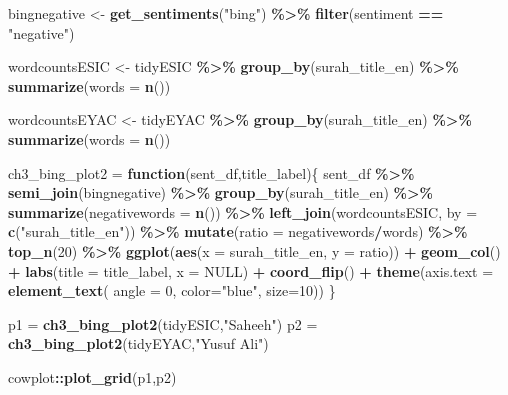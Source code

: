 \documentclass[
]{article}
\newenvironment{Shaded}{\begin{snugshade}}{\end{snugshade}}
\newcommand{\AttributeTok}[1]{\textcolor[rgb]{0.13,0.29,0.53}{#1}}
\newcommand{\ConstantTok}[1]{\textcolor[rgb]{0.56,0.35,0.01}{#1}}
\newcommand{\ControlFlowTok}[1]{\textcolor[rgb]{0.13,0.29,0.53}{\textbf{#1}}}
\newcommand{\DecValTok}[1]{\textcolor[rgb]{0.00,0.00,0.81}{#1}}
\newcommand{\FunctionTok}[1]{\textcolor[rgb]{0.13,0.29,0.53}{\textbf{#1}}}
\newcommand{\NormalTok}[1]{#1}
\newcommand{\OtherTok}[1]{\textcolor[rgb]{0.56,0.35,0.01}{#1}}
\newcommand{\SpecialCharTok}[1]{\textcolor[rgb]{0.81,0.36,0.00}{\textbf{#1}}}
\newcommand{\StringTok}[1]{\textcolor[rgb]{0.31,0.60,0.02}{#1}}
\begin{document}
\begin{Shaded}
\begin{Highlighting}[]
\NormalTok{bingnegative }\OtherTok{\textless{}{-}} \FunctionTok{get\_sentiments}\NormalTok{(}\StringTok{"bing"}\NormalTok{) }\SpecialCharTok{\%\textgreater{}\%} 
  \FunctionTok{filter}\NormalTok{(sentiment }\SpecialCharTok{==} \StringTok{"negative"}\NormalTok{)}

\NormalTok{wordcountsESIC }\OtherTok{\textless{}{-}}\NormalTok{ tidyESIC }\SpecialCharTok{\%\textgreater{}\%}
  \FunctionTok{group\_by}\NormalTok{(surah\_title\_en) }\SpecialCharTok{\%\textgreater{}\%}
  \FunctionTok{summarize}\NormalTok{(}\AttributeTok{words =} \FunctionTok{n}\NormalTok{())}

\NormalTok{wordcountsEYAC }\OtherTok{\textless{}{-}}\NormalTok{ tidyEYAC }\SpecialCharTok{\%\textgreater{}\%}
  \FunctionTok{group\_by}\NormalTok{(surah\_title\_en) }\SpecialCharTok{\%\textgreater{}\%}
  \FunctionTok{summarize}\NormalTok{(}\AttributeTok{words =} \FunctionTok{n}\NormalTok{())}

\NormalTok{ch3\_bing\_plot2 }\OtherTok{=} \ControlFlowTok{function}\NormalTok{(sent\_df,title\_label)\{}
\NormalTok{  sent\_df }\SpecialCharTok{\%\textgreater{}\%}
      \FunctionTok{semi\_join}\NormalTok{(bingnegative) }\SpecialCharTok{\%\textgreater{}\%}
      \FunctionTok{group\_by}\NormalTok{(surah\_title\_en) }\SpecialCharTok{\%\textgreater{}\%}
      \FunctionTok{summarize}\NormalTok{(}\AttributeTok{negativewords =} \FunctionTok{n}\NormalTok{()) }\SpecialCharTok{\%\textgreater{}\%}
      \FunctionTok{left\_join}\NormalTok{(wordcountsESIC, }\AttributeTok{by =} \FunctionTok{c}\NormalTok{(}\StringTok{"surah\_title\_en"}\NormalTok{)) }\SpecialCharTok{\%\textgreater{}\%}
      \FunctionTok{mutate}\NormalTok{(}\AttributeTok{ratio =}\NormalTok{ negativewords}\SpecialCharTok{/}\NormalTok{words) }\SpecialCharTok{\%\textgreater{}\%}
      \FunctionTok{top\_n}\NormalTok{(}\DecValTok{20}\NormalTok{) }\SpecialCharTok{\%\textgreater{}\%}
      \FunctionTok{ggplot}\NormalTok{(}\FunctionTok{aes}\NormalTok{(}\AttributeTok{x =}\NormalTok{ surah\_title\_en, }\AttributeTok{y =}\NormalTok{ ratio)) }\SpecialCharTok{+}
        \FunctionTok{geom\_col}\NormalTok{() }\SpecialCharTok{+}
        \FunctionTok{labs}\NormalTok{(}\AttributeTok{title =}\NormalTok{ title\_label, }\AttributeTok{x =} \ConstantTok{NULL}\NormalTok{) }\SpecialCharTok{+}
        \FunctionTok{coord\_flip}\NormalTok{() }\SpecialCharTok{+}
        \FunctionTok{theme}\NormalTok{(}\AttributeTok{axis.text =} \FunctionTok{element\_text}\NormalTok{( }
              \AttributeTok{angle =} \DecValTok{0}\NormalTok{, }
              \AttributeTok{color=}\StringTok{"blue"}\NormalTok{, }
              \AttributeTok{size=}\DecValTok{10}\NormalTok{))}
\NormalTok{\}}

\NormalTok{p1 }\OtherTok{=} \FunctionTok{ch3\_bing\_plot2}\NormalTok{(tidyESIC,}\StringTok{"Saheeh"}\NormalTok{)}
\NormalTok{p2 }\OtherTok{=} \FunctionTok{ch3\_bing\_plot2}\NormalTok{(tidyEYAC,}\StringTok{"Yusuf Ali"}\NormalTok{)}

\NormalTok{cowplot}\SpecialCharTok{::}\FunctionTok{plot\_grid}\NormalTok{(p1,p2)}
\end{Highlighting}
\end{Shaded}
\end{document}
